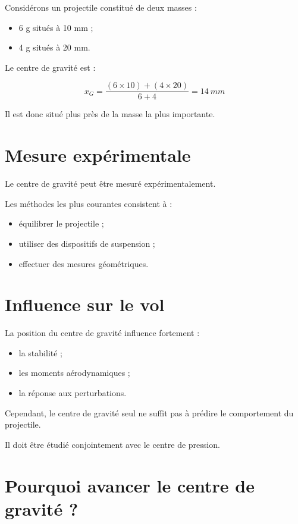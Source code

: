 Considérons un projectile constitué de deux masses :

\begin{itemize}
    \item 6 g situés à 10 mm ;
    \item 4 g situés à 20 mm.
\end{itemize}

Le centre de gravité est :

\begin{equation}
x_G =
\frac{(6 \times 10)+(4 \times 20)}
     {6+4}
=
14~mm
\end{equation}

Il est donc situé plus près de la masse la plus importante.

\section{Mesure expérimentale}

Le centre de gravité peut être mesuré expérimentalement.

Les méthodes les plus courantes consistent à :

\begin{itemize}
    \item équilibrer le projectile ;
    \item utiliser des dispositifs de suspension ;
    \item effectuer des mesures géométriques.
\end{itemize}

\section{Influence sur le vol}

La position du centre de gravité influence fortement :

\begin{itemize}
    \item la stabilité ;
    \item les moments aérodynamiques ;
    \item la réponse aux perturbations.
\end{itemize}

Cependant, le centre de gravité seul ne suffit pas à prédire le comportement
du projectile.

Il doit être étudié conjointement avec le centre de pression.

\section{Pourquoi avancer le centre de gravité ?}

